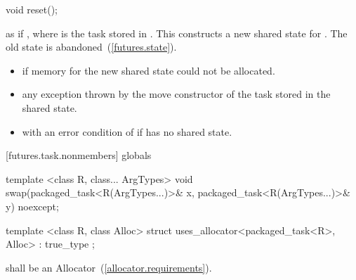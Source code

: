 %
%
\begin{itemdecl}
void reset();
\end{itemdecl}

\begin{itemdescr}
\pnum
\effects as if , where
 is the task stored in
. \enternote This constructs a new shared state for . The
old state is abandoned~(\ref{futures.state}). \exitnote

\pnum
\throws
\begin{itemize}
\item {} if memory for the new shared state could not be allocated.
\item any exception thrown by the move constructor of the task stored in the shared
state.
\item {} with an error condition of  if 
has no shared state.
\end{itemize}
\end{itemdescr}

[futures.task.nonmembers]{ globals}

%
%
\begin{itemdecl}
template <class R, class... ArgTypes>
  void swap(packaged_task<R(ArgTypes...)>& x, packaged_task<R(ArgTypes...)>& y) noexcept;
\end{itemdecl}

\begin{itemdescr}
\pnum
\effects {}
\end{itemdescr}

%
\begin{itemdecl}
template <class R, class Alloc>
  struct uses_allocator<packaged_task<R>, Alloc>
    : true_type { };
\end{itemdecl}

\begin{itemdescr}
\pnum
\requires {} shall be an Allocator~(\ref{allocator.requirements}).
\end{itemdescr}
